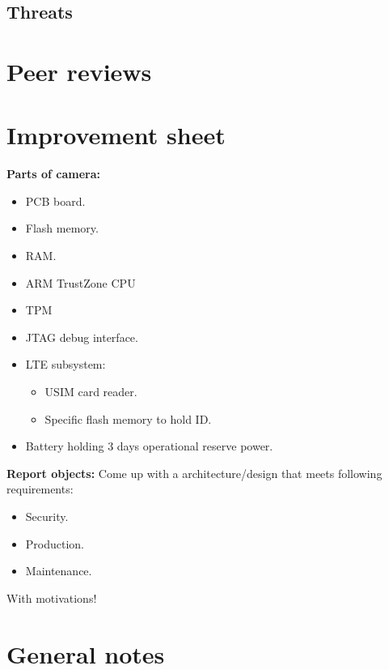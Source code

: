 \documentclass[10pt]{article}
\begin{document}
    \subsection{Threats}


    

  \section{Peer reviews}

  \section{Improvement sheet}

  \newpage

  \textbf{Parts of camera:}
  \begin{itemize}
    \item{PCB board.}
    \item{Flash memory.}
    \item{RAM.}
    \item{ARM TrustZone CPU}
    \item{TPM}
    \item{JTAG debug interface.}
    \item{LTE subsystem:}
    \begin{itemize}
      \item{USIM card reader.}
      \item{Specific flash memory to hold ID.}
    \end{itemize}
    \item{Battery holding 3 days operational reserve power.}
  \end{itemize}

  \textbf{Report objects:}
  Come up with a architecture/design that meets following requirements:
  \begin{itemize}
    \item{Security.}
    \item{Production.}
    \item{Maintenance.}
  \end{itemize}
  With motivations!

  \section{General notes}
\end{document}
